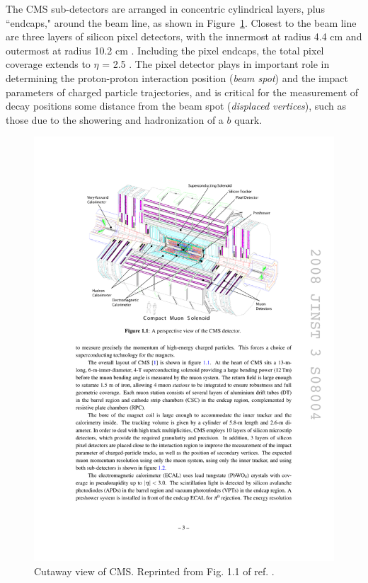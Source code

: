 \documentclass[dissertation.tex]{subfiles}
\begin{document}
The CMS sub-detectors are arranged in concentric cylindrical layers, plus ``endcaps," around the beam line, as shown in Figure~\ref{fig:CMS_cutaway}.  Closest to the beam line are three layers of silicon pixel detectors, with the innermost at radius 4.4 cm and outermost at radius 10.2 cm \cite{1748-0221-3-08-S08004}.  Including the pixel endcaps, the total pixel coverage extends to $\eta$ = 2.5 \cite{1748-0221-3-08-S08004}.  The pixel detector plays in important role in determining the proton-proton interaction position (\textit{beam spot}) and the impact parameters of charged particle trajectories, and is critical for the measurement of decay positions some distance from the beam spot (\textit{displaced vertices}), such as those due to the showering and hadronization of a $b$ quark.

\begin{figure}
	\centering
	\includegraphics[scale=1.0]{CMS_cutaway}
	\caption{Cutaway view of CMS.  Reprinted from Fig. 1.1 of ref. \cite{1748-0221-3-08-S08004}.}
	\label{fig:CMS_cutaway}
\end{figure}
\end{document}

